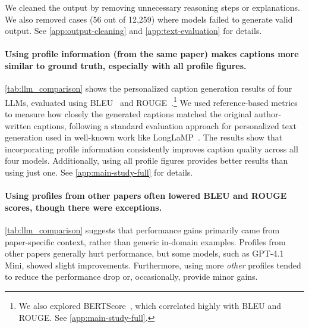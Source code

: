 We cleaned the output by removing unnecessary reasoning steps or explanations. 
We also removed cases (56 out of 12,259) where models failed to generate valid output. 
See \autoref{app:output-cleaning} and %
\autoref{app:text-evaluation} for details.




\paragraph{Using profile information (from the same paper) makes captions more similar to ground truth, especially with all profile figures.}\label{para:profile-result}
\autoref{tab:llm_comparison} shows the personalized caption generation results of four LLMs, evaluated using BLEU~\cite{papineni2002bleu} and ROUGE~\cite{lin2004rouge}.\footnote{We also explored BERTScore~\cite{zhang2019bertscore}, which correlated highly with BLEU and ROUGE. See \autoref{app:main-study-full}.}
We used reference-based metrics to measure how closely the generated captions matched the original author-written captions, following a standard evaluation approach for personalized text generation used in well-known work like LongLaMP~\cite{kumar2024longlamp}.
The results show that incorporating profile information consistently improves caption quality across all four models.
Additionally, using all profile figures provides better results than using just one.
See \autoref{app:main-study-full} for details.




\paragraph{Using profiles from other papers often lowered BLEU and ROUGE scores, though there were exceptions.} 
\autoref{tab:llm_comparison} suggests that performance gains primarily came from paper-specific context, rather than generic in-domain examples. 
Profiles from other papers generally hurt performance, but some models, such as GPT-4.1 Mini, showed slight improvements. 
Furthermore, using more \textit{other} profiles tended to reduce the performance drop or, occasionally, provide minor gains.



